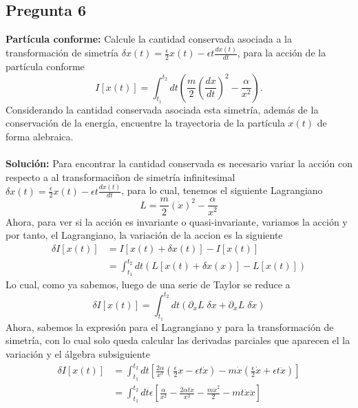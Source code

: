 \documentclass[../main_ej.tex]{subfiles}
\begin{document}
\subsection{Pregunta 6}
\textbf{Partícula conforme:}
Calcule la cantidad conservada asociada a la transformación de simetría $\delta x(t)=\frac{\epsilon}{2}x(t)-\epsilon t\frac{dx(t)}{dt}$, para la acción de la partícula conforme
\begin{equation}
  I[x(t)] = \int_{t_1}^{t_2} dt \left( \frac{m}{2}\left( \frac{dx}{dt} \right)^2 - \frac{\alpha}{x^2} \right).
\end{equation}
Considerando la cantidad conservada asociada esta simetría, además de la conservación de la energía, encuentre la trayectoria de la partícula $x(t)$ de forma alebraica. \\
\\
\textbf{Solución:}
Para encontrar la cantidad conservada es necesario variar la acción con respecto a al transformaciñon de simetría infinitesimal $\delta x(t) = \frac{\epsilon}{2}x(t) - \epsilon t \frac{dx(t)}{dt}$, para lo cual, tenemos el siguiente Lagrangiano 
\begin{equation}
  L = \frac{m}{2}\left( \dot{x} \right)^2 - \frac{\alpha}{x^2}
\end{equation}
Ahora, para ver si la acción es invariante o quasi-invariante, variamos la acción y por tanto, el Lagrangiano, la variación de la accion es la siguiente
\begin{align*}
  \delta I[x(t)] & = I[x(t)+\delta x(t)]-I[x(t)] \\
  & = \int_{t_1}^{t_2} dt \left(L[x(t) + \delta x(x)] - L[x(t)]\right)
\end{align*}
Lo cual, como ya sabemos, luego de una serie de Taylor se reduce a
\begin{equation*}
  \delta I[x(t)] = \int_{t_1}^{t_2} dt \left( \partial_{x}L \; \delta x + \partial_{\dot{x}}L\; \delta \dot{x} \right)
\end{equation*}
Ahora, sabemos la expresión para el Lagrangiano y para la transformación de simetría, con lo cual solo queda calcular las derivadas parciales que aparecen el la variación y el álgebra subsiguiente
\begin{align*}
  \delta I [x(t)] & = \int_{t_1}^{t_2} dt \left[ \frac{2\alpha}{x^3} \left( \frac{\epsilon}{2}x -\epsilon t \dot{x}  \right) -  m\dot{x}\left( \frac{\epsilon}{2}\dot{x} + \epsilon t\ddot{x} \right) \right] \\
  & = \int_{t_1}^{t_2}  dt \epsilon\left[ \frac{\alpha}{x^2} - \frac{2\alpha t \dot{x}}{x^3} - \frac{m\dot{x}^2}{2} - m t \dot{x}\ddot{x}  \right]
\end{align*}
\end{document}
